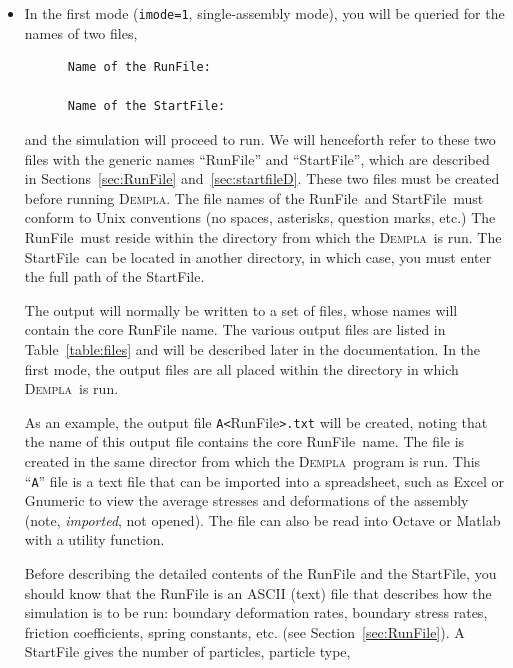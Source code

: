 \documentclass[letterpaper,11pt]{article}
\newcommand{\Dempla}{\textsc{Dempla}}
\newcommand{\RunFile}{\textsf{RunFile}}
\newcommand{\StartFile}{\textsf{StartFile}}
\begin{document}
\begin{itemize}
  \item
	In the first mode (\texttt{imode=1}, single-assembly mode),
    you will be queried for the names of two
    files,
    \begin{verbatim}
      Name of the RunFile:
      
      Name of the StartFile:
    \end{verbatim}
    and the simulation will proceed to run.
    We will henceforth refer to these two files 
    with the generic names ``\textsf{RunFile}'' and
    ``\textsf{StartFile}'', which are described in
    Sections~\ref{sec:RunFile} and~\ref{sec:startfileD}.
    These two files must be created before running
    \Dempla.
    The file names of the \RunFile\ and \StartFile\ must
    conform to Unix conventions
    (no spaces, asterisks, question marks, etc.)
    The \RunFile\ must reside within the directory from
    which the \Dempla\ is run.
    The \StartFile\ can be located in another directory,
    in which case, you must enter the full path of the
    \StartFile.
    \par
    The output will normally be written to a set of files,
    whose names will
    contain the core \textsf{RunFile} name.
    The various output files are listed in
    Table~\ref{table:files} and 
    will be described later in the documentation.
    In the first mode, the output files are all placed within
    the directory in which \Dempla\ is run.
    \par
    As an example,
    the output file \mbox{\texttt{A<}\textsf{RunFile}\texttt{>.txt}}
    will be created, noting that
    the name of this output file contains
    the core \RunFile\ name.
    The file is created in the same director from which the
    \Dempla\ program is run.
    This ``\texttt{A}'' file
    is a text file that can be imported into a spreadsheet, such as
    Excel or Gnumeric to view the average stresses and deformations
    of the assembly (note, \emph{imported}, not opened).
    The file can also be read into Octave or Matlab with a utility function.
    \par
    Before describing the detailed contents of the \textsf{RunFile}
    and the \textsf{StartFile}, you should know
    that the \textsf{RunFile}
    is an ASCII (text) file that describes
    how the simulation is to be run:
    boundary deformation rates, boundary stress rates,
    friction coefficients, spring constants, etc.
    (see Section~\ref{sec:RunFile}).
    A \textsf{StartFile} gives the number of particles, particle type,

\end{itemize}
\end{document}
